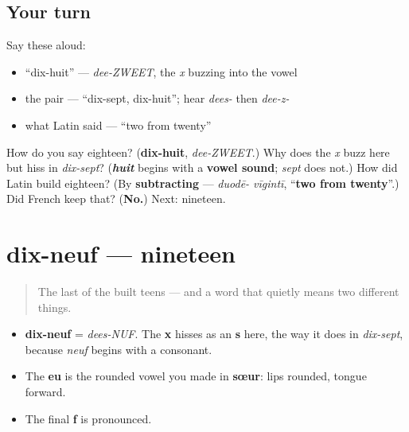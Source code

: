 \subsection*{Your turn}
Say these aloud:

\begin{itemize}
\raggedright
  \item \textquotedblleft{}dix-huit\textquotedblright{} — \emph{dee-ZWEET}, the \emph{x} buzzing into the vowel
  \item the pair — \textquotedblleft{}dix-sept, dix-huit\textquotedblright{}; hear \emph{dees-} then \emph{dee-z-}
  \item what Latin said — \textquotedblleft{}two from twenty\textquotedblright{}
\end{itemize}

\begin{tcolorbox}[breakable,colback=teal!4,colframe=teal!35!black,title={Before you move on}]
How do you say eighteen? (\textbf{dix-huit}, \emph{dee-ZWEET}.) Why does the \emph{x} buzz here but hiss in \emph{dix-sept}? (\emph{\textbf{huit}} begins with a \textbf{vowel sound}; \emph{sept} does not.) How did Latin build eighteen? (By \textbf{subtracting} — \emph{duodē- vīgintī}, \textquotedblleft{}\textbf{two from twenty}\textquotedblright{}.) Did French keep that? (\textbf{No.}) Next: nineteen.
\end{tcolorbox}
\section[dix-neuf]{dix-neuf — nineteen}

\label{lesson:FR-C12-dix-neuf}



\begin{quote}
The last of the built teens — and a word that quietly means two different things.
\end{quote}

\begin{sounds}
\begin{itemize}
\raggedright
  \item \textbf{dix-neuf} = \emph{dees-NUF}. The \textbf{x} hisses as an \textbf{s} here, the way it does in \emph{dix-sept}, because \emph{neuf} begins with a consonant.
  \item The \textbf{eu} is the rounded vowel you made in \textbf{sœur}: lips rounded, tongue forward.
  \item The final \textbf{f} is pronounced.
\end{itemize}
\end{sounds}

